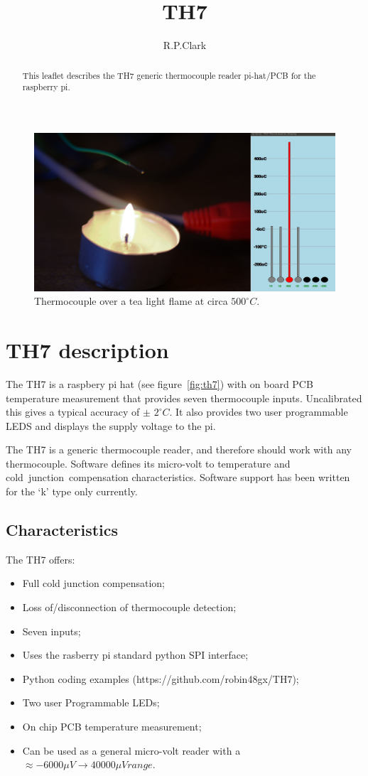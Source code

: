 \documentclass[a4paper,10pt]{article}
\title{TH7}
\author{R.P.Clark}
\begin{document}
\maketitle
\begin{abstract}
This leaflet describes the TH7 generic thermocouple reader pi-hat/PCB for the raspberry pi.
\end{abstract}

\begin{figure}[ht]
 \centering
 \includegraphics[width=400pt]{TH7_tea_light.jpg}
 \caption{Thermocouple over a tea light flame at circa ${500}^{\circ} C$.}
 \label{fig:pi}
\end{figure}


\section{TH7 description}
The TH7 is a raspbery pi hat (see figure~\ref{fig:th7}) with on board PCB temperature measurement that
provides seven thermocouple inputs.
Uncalibrated this gives a typical accuracy of $\pm$ ${2}^{\circ} C$.
It also provides two user programmable LEDS and displays the supply voltage to the pi.

The TH7 is a generic thermocouple reader, and therefore should work with any thermocouple.
Software defines its micro-volt to temperature and cold~junction~compensation characteristics.
Software support has been written for the `k' type only currently.

\clearpage
\subsection{Characteristics}
The TH7 offers:
\begin{itemize}
 \item Full cold junction compensation;
 \item Loss of/disconnection of thermocouple detection;
 \item Seven inputs;
 \item Uses the rasberry pi standard python SPI interface;
 \item Python coding examples (https://github.com/robin48gx/TH7);
 \item Two user Programmable LEDs;
 \item On chip PCB temperature measurement;
  \item Can be used as a general micro-volt reader with a $\approx -6000 \mu V \rightarrow 40000 \mu V range$.
\end{itemize} 
\end{document}
